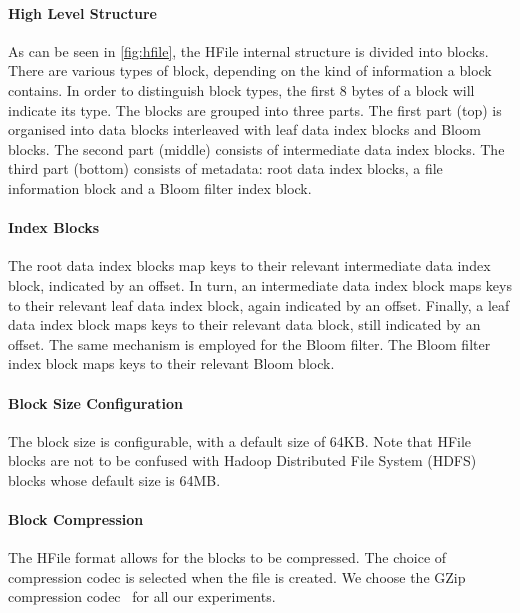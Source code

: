 
\paragraph{High Level Structure} As can be seen in \autoref{fig:hfile},
the HFile internal structure is divided into blocks. There are various types of
block, depending on the kind of information a block contains.
In order to
distinguish block types, the first 8 bytes of a
block will indicate its type. The blocks are grouped into
three parts. The first part (top) is organised into
data blocks interleaved with leaf data index blocks and Bloom blocks.
The second part (middle) consists of intermediate data index blocks.
The third part (bottom) consists of metadata: root data index blocks, a file
information block and a Bloom filter index block.

\paragraph{Index Blocks} The root data index blocks map keys to their
relevant intermediate data index block, indicated by
an offset. In turn, an intermediate data index block
maps keys to their relevant leaf data index block, again indicated by an offset.
Finally, a leaf data index block maps keys to their relevant data block,
still indicated by an offset. The same mechanism is employed for the Bloom filter.
The Bloom filter index block maps keys to their relevant Bloom block.

\paragraph{Block Size Configuration} The block size is
configurable, with a default size of 64KB. Note that HFile blocks are not to be
confused with Hadoop Distributed File System (HDFS) blocks whose default size is
64MB.

\paragraph{Block Compression} The HFile format allows for
the blocks to be compressed. The choice of compression codec is selected when
the file is created. We choose the GZip compression
codec~\citep{Deutsch:1996:ZCD:RFC1950} for all our %
experiments.

